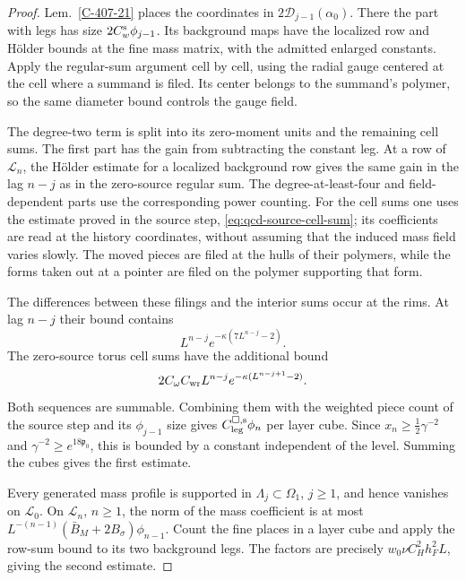 \documentclass[11pt,letterpaper,reqno]{amsart}
\theoremstyle{definition}
\theoremstyle{remark}
\begin{document}
\begin{proof}
Lem.~\ref{C-407-21} places the coordinates in
$2\mathscr D_{j-1}(\alpha_0)$. There the part with legs has size
$2C_w^{\rm s}\phi_{j-1}$. Its background maps have the localized
row and H\"older bounds at the fine mass matrix, with the admitted
enlarged constants. Apply the regular-sum argument cell by cell,
using the radial gauge centered at the cell where a summand is
filed. Its center belongs to the summand's polymer, so the same
diameter bound controls the gauge field.

The degree-two term is split into its zero-moment units and the
remaining cell sums. The first part has the gain from subtracting
the constant leg. At a row of $\mathcal L_n$, the H\"older estimate
for a localized background row gives the same gain in the lag
$n-j$ as in the zero-source regular sum. The degree-at-least-four
and field-dependent parts use the corresponding power counting.
For the cell sums one uses the estimate proved in the source step,
\eqref{eq:qcd-source-cell-sum}; its coefficients are read at the
history coordinates, without assuming that the induced mass field
varies slowly. The moved pieces are filed at the hulls of their
polymers, while the forms taken out at a pointer are filed on the
polymer supporting that form.

The differences between these filings and the interior sums occur
at the rims. At lag $n-j$ their bound contains
\[
 L^{n-j}e^{-\kappa(7L^{n-j}-2)}.
\]
The zero-source torus cell sums have the additional bound
\[
 2C_\omega C_{\rm wr}L^{n-j}
                   e^{-\kappa(L^{n-j+1}-2)}.
\]
Both sequences are summable. Combining them with the weighted
piece count of the source step and its $\phi_{j-1}$ size gives
$C^{{\square},{\rm s}}_{\rm leg}\phi_n$ per layer cube.
Since $x_n\ge\tfrac12\gamma^{-2}$ and
$\gamma^{-2}\ge e^{18\mathfrak p_0}$, this is bounded by a
constant independent of the level. Summing the cubes gives the
first estimate.

Every generated mass profile is supported in $\Lambda_j\subset\Omega_1$,
$j\ge1$, and hence vanishes on $\mathcal L_0$.
On $\mathcal L_n$, $n\ge1$, the norm of the mass coefficient is at most
$L^{-(n-1)}(\bar B_M+2B_\sigma)\phi_{n-1}$. Count the fine
places in a layer cube and apply the row-sum bound to its two
background legs. The factors are precisely
$w_0\nu C_H^2h_F^2L$, giving the second estimate.
\end{proof}
\end{document}
